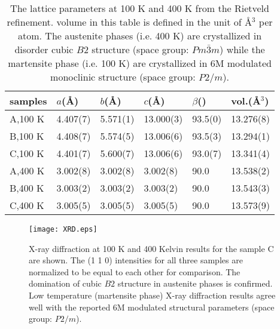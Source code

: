 \documentclass[sort&compress,twocolumn,3p]{elsarticle}
\begin{document}
\begin{table}
\centering
\footnotesize
\begin{tabular}{l|p{8mm}p{8mm}p{9mm}p{6mm}p{8mm}}
\hline\hline
samples	&	$a$(\AA)	&	$b$(\AA) &	$c$(\AA)	& $\beta$(\degree) & vol.(\AA$^3$)\\
\hline
A,100 K	&4.407(7)	&5.571(1)	&13.000(3)	&93.5(0)	&	13.276(8)\\
B,100 K	&4.408(7)	&5.574(5)	&13.006(6)	&93.5(3)	&	13.294(1)\\
C,100 K	&4.401(7)	&5.600(7)	&13.006(6)	&93.0(7)	&	13.341(4)\\
\hline
A,400 K	&3.002(8)	&3.002(8)	&3.002(8) 	&90.0		&	13.538(2)\\
B,400 K	&3.003(2)	&3.003(2)	&3.003(2) 	&90.0		&	13.543(3)\\
C,400 K	&3.005(5)	&3.005(5)	&3.005(5) 	&90.0		&	13.573(9)\\
\hline\hline
\end{tabular}
\caption{The lattice parameters at 100 K and 400 K from the Rietveld refinement. volume in this table is defined in the unit of \AA$^3$ per atom.
		The austenite phases (i.e. 400 K) are crystallized in disorder cubic $B2$ structure (space group: $Pm\bar{3}m$) while the martensite phase (i.e. 100 K) are crystallized in 6M modulated monoclinic structure (space group: $P2/m$).}
\label{xrdtable}
\end{table}

\begin{figure}
\texttt{[image: XRD.eps]}
\caption{X-ray diffraction at 100 K and 400 Kelvin results for the sample C are shown.
The (1 1 0) intensities for all three samples are normalized to be equal to each other for comparison.
The domination of cubic $B2$ structure in austenite phases is confirmed.
Low temperature (martensite phase) X-ray diffraction results agree well with the reported 6M modulated structural parameters (space group: $P2/m$)\cite{Yan2015375}.}
\label{xrd}
\end{figure}
\end{document}
